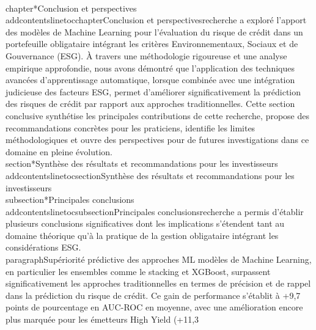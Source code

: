 \\chapter*{Conclusion et perspectives}\n\\addcontentsline{toc}{chapter}{Conclusion et perspectives}\n\nCette recherche a exploré l'apport des modèles de Machine Learning pour l'évaluation du risque de crédit dans un portefeuille obligataire intégrant les critères Environnementaux, Sociaux et de Gouvernance (ESG). À travers une méthodologie rigoureuse et une analyse empirique approfondie, nous avons démontré que l'application des techniques avancées d'apprentissage automatique, lorsque combinée avec une intégration judicieuse des facteurs ESG, permet d'améliorer significativement la prédiction des risques de crédit par rapport aux approches traditionnelles. Cette section conclusive synthétise les principales contributions de cette recherche, propose des recommandations concrètes pour les praticiens, identifie les limites méthodologiques et ouvre des perspectives pour de futures investigations dans ce domaine en pleine évolution.\n\n\\section*{Synthèse des résultats et recommandations pour les investisseurs}\n\\addcontentsline{toc}{section}{Synthèse des résultats et recommandations pour les investisseurs}\n\n\\subsection*{Principales conclusions}\n\\addcontentsline{toc}{subsection}{Principales conclusions}\n\nNotre recherche a permis d'établir plusieurs conclusions significatives dont les implications s'étendent tant au domaine théorique qu'à la pratique de la gestion obligataire intégrant les considérations ESG.\n\n\\paragraph{Supériorité prédictive des approches ML} \nLes modèles de Machine Learning, en particulier les ensembles comme le stacking et XGBoost, surpassent significativement les approches traditionnelles en termes de précision et de rappel dans la prédiction du risque de crédit. Ce gain de performance s'établit à +9,7 points de pourcentage en AUC-ROC en moyenne, avec une amélioration encore plus marquée pour les émetteurs High Yield (+11,3\\%
